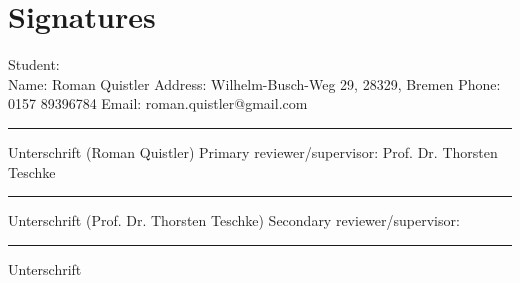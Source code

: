 \section{Signatures}
\label{subsec:signatures}

Student:
\newline
\\
\hspace*{1em} Name: Roman Quistler
\newline
\hspace*{1em} Address: Wilhelm-Busch-Weg 29, 28329, Bremen
\newline
\hspace*{1em} Phone: 0157 89396784
\newline
\hspace*{1em} Email: roman.quistler@gmail.com
\newline
\newline
\newline
\mbox{}\hfill\noindent\rule{8cm}{0.4pt}
\newline
\newline
\mbox{}\hfill Unterschrift (Roman Quistler)
\newline
\newline
\newline
Primary reviewer/supervisor: Prof. Dr. Thorsten Teschke
\newline
\newline
\newline
\mbox{}\hfill\noindent\rule{8cm}{0.4pt}
\newline
\newline
\mbox{}\hfill Unterschrift (Prof. Dr. Thorsten Teschke)
\newline
\newline
Secondary reviewer/supervisor:
\newline
\newline
\newline
\mbox{}\hfill\noindent\rule{8cm}{0.4pt}
\newline
\newline
\mbox{}\hfill Unterschrift


